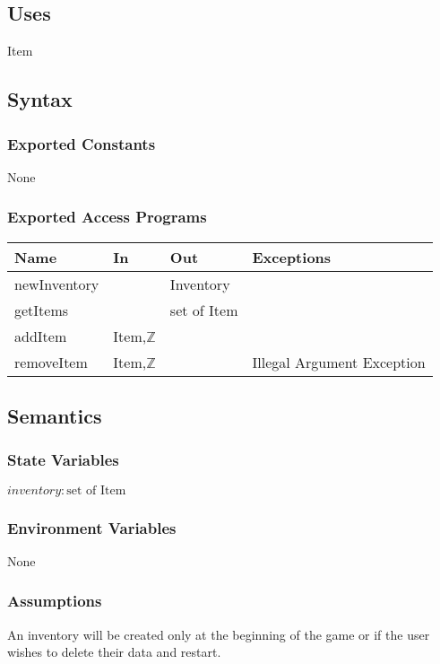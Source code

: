\documentclass[12pt, titlepage]{article}
\begin{document}
\subsection{Uses}
Item


\subsection{Syntax}

\subsubsection{Exported Constants}
None

\subsubsection{Exported Access Programs}

\begin{center}
\begin{tabular}{p{2cm} p{4cm} p{4cm} p{2cm}}
\hline
\textbf{Name} & \textbf{In} & \textbf{Out} & \textbf{Exceptions} \\
\hline
newInventory & & Inventory \\
\hline
getItems &  & set of Item & \\
\hline
addItem & Item,$\mathbb{Z}$  &  & \\
\hline
removeItem & Item,$\mathbb{Z}$ & & Illegal Argument Exception\\
\hline
\end{tabular}
\end{center}

\subsection{Semantics}

\subsubsection{State Variables}
$\mathit{inventory}: \text{set of Item}$\\

\subsubsection{Environment Variables}
None

\subsubsection{Assumptions}
An inventory will be created only at the beginning of the game or if the user wishes to delete their data and restart.
\end{document}
